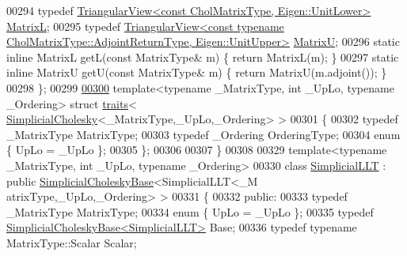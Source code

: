 \begin{DoxyCode}
00294   \textcolor{keyword}{typedef} \hyperlink{group___core___module_class_eigen_1_1_triangular_view}{TriangularView<const CholMatrixType, Eigen::UnitLower>}
        \hyperlink{group___core___module_class_eigen_1_1_triangular_view}{MatrixL};
00295   \textcolor{keyword}{typedef} 
      \hyperlink{group___core___module_class_eigen_1_1_triangular_view}{TriangularView<const typename CholMatrixType::AdjointReturnType, Eigen::UnitUpper>}
       \hyperlink{group___core___module_class_eigen_1_1_triangular_view}{MatrixU};
00296   \textcolor{keyword}{static} \textcolor{keyword}{inline} MatrixL getL(\textcolor{keyword}{const} MatrixType& m) \{ \textcolor{keywordflow}{return} MatrixL(m); \}
00297   \textcolor{keyword}{static} \textcolor{keyword}{inline} MatrixU getU(\textcolor{keyword}{const} MatrixType& m) \{ \textcolor{keywordflow}{return} MatrixU(m.adjoint()); \}
00298 \};
00299 
\hyperlink{struct_eigen_1_1internal_1_1traits_3_01_simplicial_cholesky_3_01___matrix_type_00_01___up_lo_00_01___ordering_01_4_01_4}{00300} \textcolor{keyword}{template}<\textcolor{keyword}{typename} \_MatrixType, \textcolor{keywordtype}{int} \_UpLo, \textcolor{keyword}{typename} \_Ordering> \textcolor{keyword}{struct }\hyperlink{struct_eigen_1_1internal_1_1traits}{traits}<
      \hyperlink{group___sparse_cholesky___module_class_eigen_1_1_simplicial_cholesky}{SimplicialCholesky}<\_MatrixType,\_UpLo,\_Ordering> >
00301 \{
00302   \textcolor{keyword}{typedef} \_MatrixType MatrixType;
00303   \textcolor{keyword}{typedef} \_Ordering OrderingType;
00304   \textcolor{keyword}{enum} \{ UpLo = \_UpLo \};
00305 \};
00306 
00307 \}
00308 
00329 \textcolor{keyword}{template}<\textcolor{keyword}{typename} \_MatrixType, \textcolor{keywordtype}{int} \_UpLo, \textcolor{keyword}{typename} \_Ordering>
00330     \textcolor{keyword}{class }\hyperlink{group___sparse_cholesky___module_class_eigen_1_1_simplicial_l_l_t}{SimplicialLLT} : \textcolor{keyword}{public} \hyperlink{group___sparse_cholesky___module_class_eigen_1_1_simplicial_cholesky_base}{SimplicialCholeskyBase}<SimplicialLLT<\_M
      atrixType,\_UpLo,\_Ordering> >
00331 \{
00332 \textcolor{keyword}{public}:
00333     \textcolor{keyword}{typedef} \_MatrixType MatrixType;
00334     \textcolor{keyword}{enum} \{ UpLo = \_UpLo \};
00335     \textcolor{keyword}{typedef} \hyperlink{group___sparse_cholesky___module_class_eigen_1_1_simplicial_cholesky_base}{SimplicialCholeskyBase<SimplicialLLT>} Base;
00336     \textcolor{keyword}{typedef} \textcolor{keyword}{typename} MatrixType::Scalar Scalar;

\end{DoxyCode}
